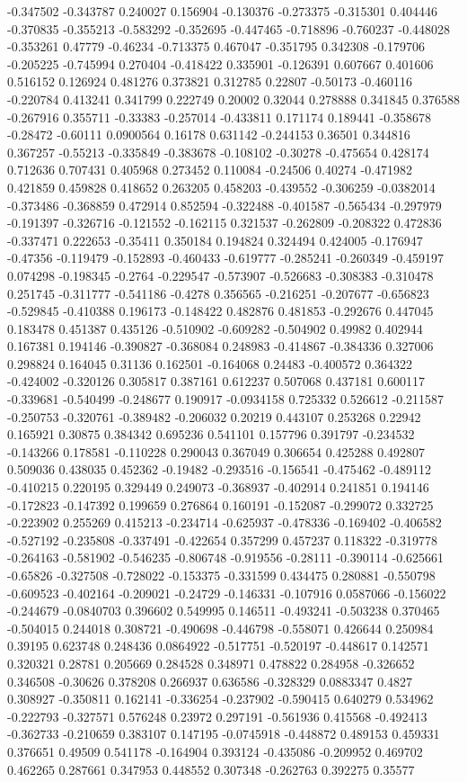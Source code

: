 -0.347502 -0.343787 0.240027 0.156904 -0.130376 -0.273375 -0.315301 0.404446 -0.370835 -0.355213 -0.583292 -0.352695 -0.447465 -0.718896 -0.760237 -0.448028 -0.353261 0.47779 -0.46234 -0.713375 0.467047 -0.351795 0.342308 -0.179706 -0.205225 -0.745994 0.270404 -0.418422 0.335901 -0.126391 0.607667 0.401606 0.516152 0.126924 0.481276 0.373821 0.312785 0.22807 -0.50173 -0.460116 -0.220784 0.413241 0.341799 0.222749 0.20002 0.32044 0.278888 0.341845 0.376588 -0.267916 0.355711 -0.33383 -0.257014 -0.433811 0.171174 0.189441 -0.358678 -0.28472 -0.60111 0.0900564 0.16178 0.631142 -0.244153 0.36501 0.344816 0.367257 -0.55213 -0.335849 -0.383678 -0.108102 -0.30278 -0.475654 0.428174 0.712636 0.707431 0.405968 0.273452 0.110084 -0.24506 0.40274 -0.471982 0.421859 0.459828 0.418652 0.263205 0.458203 -0.439552 -0.306259 -0.0382014 -0.373486 -0.368859 0.472914 0.852594 -0.322488 -0.401587 -0.565434 -0.297979 -0.191397 -0.326716 -0.121552 -0.162115 0.321537 -0.262809 -0.208322 0.472836 -0.337471 0.222653 -0.35411 0.350184 0.194824 0.324494 0.424005 -0.176947 -0.47356 -0.119479 -0.152893 -0.460433 -0.619777 -0.285241 -0.260349 -0.459197 0.074298 -0.198345 -0.2764 -0.229547 -0.573907 -0.526683 -0.308383 -0.310478 0.251745 -0.311777 -0.541186 -0.4278 0.356565 -0.216251 -0.207677 -0.656823 -0.529845 -0.410388 0.196173 -0.148422 0.482876 0.481853 -0.292676 0.447045 0.183478 0.451387 0.435126 -0.510902 -0.609282 -0.504902 0.49982 0.402944 0.167381 0.194146 -0.390827 -0.368084 0.248983 -0.414867 -0.384336 0.327006 0.298824 0.164045 0.31136 0.162501 -0.164068 0.24483 -0.400572 0.364322 -0.424002 -0.320126 0.305817 0.387161 0.612237 0.507068 0.437181 0.600117 -0.339681 -0.540499 -0.248677 0.190917 -0.0934158 0.725332 0.526612 -0.211587 -0.250753 -0.320761 -0.389482 -0.206032 0.20219 0.443107 0.253268 0.22942 0.165921 0.30875 0.384342 0.695236 0.541101 0.157796 0.391797 -0.234532 -0.143266 0.178581 -0.110228 0.290043 0.367049 0.306654 0.425288 0.492807 0.509036 0.438035 0.452362 -0.19482 -0.293516 -0.156541 -0.475462 -0.489112 -0.410215 0.220195 0.329449 0.249073 -0.368937 -0.402914 0.241851 0.194146 -0.172823 -0.147392 0.199659 0.276864 0.160191 -0.152087 -0.299072 0.332725 -0.223902 0.255269 0.415213 -0.234714 -0.625937 -0.478336 -0.169402 -0.406582 -0.527192 -0.235808 -0.337491 -0.422654 0.357299 0.457237 0.118322 -0.319778 -0.264163 -0.581902 -0.546235 -0.806748 -0.919556 -0.28111 -0.390114 -0.625661 -0.65826 -0.327508 -0.728022 -0.153375 -0.331599 0.434475 0.280881 -0.550798 -0.609523 -0.402164 -0.209021 -0.24729 -0.146331 -0.107916 0.0587066 -0.156022 -0.244679 -0.0840703 0.396602 0.549995 0.146511 -0.493241 -0.503238 0.370465 -0.504015 0.244018 0.308721 -0.490698 -0.446798 -0.558071 0.426644 0.250984 0.39195 0.623748 0.248436 0.0864922 -0.517751 -0.520197 -0.448617 0.142571 0.320321 0.28781 0.205669 0.284528 0.348971 0.478822 0.284958 -0.326652 0.346508 -0.30626 0.378208 0.266937 0.636586 -0.328329 0.0883347 0.4827 0.308927 -0.350811 0.162141 -0.336254 -0.237902 -0.590415 0.640279 0.534962 -0.222793 -0.327571 0.576248 0.23972 0.297191 -0.561936 0.415568 -0.492413 -0.362733 -0.210659 0.383107 0.147195 -0.0745918 -0.448872 0.489153 0.459331 0.376651 0.49509 0.541178 -0.164904 0.393124 -0.435086 -0.209952 0.469702 0.462265 0.287661 0.347953 0.448552 0.307348 -0.262763 0.392275 0.35577 